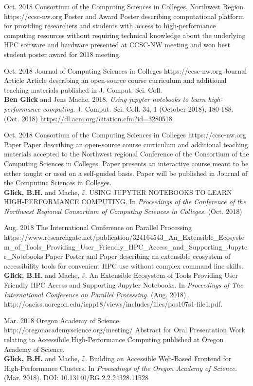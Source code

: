 \documentclass[10pt]{article} %
\begin{document}
\award
{Oct. 2018}
{}
{Consortium of the Computing Sciences in Colleges, Northwest Region.}
{https://ccsc-nw.org}
{Poster and Award}
{Poster describing computational platform for providing researchers and students with access to high-performance computing resources without requiring technical knowledge about the underlying HPC software and hardware presented at CCSC-NW meeting and won best student poster award for 2018 meeting.}


\award
{Oct. 2018}
{}
{Journal of Computing Sciences in Colleges}
{https://ccsc-nw.org}
{Journal Article}
{Article describing an open-source course curriculum and additional teaching materials published in J. Comput. Sci. Coll. \\ \textbf{Ben Glick} and Jens Mache. 2018. \textit{Using jupyter notebooks to learn high-performance computing.} J. Comput. Sci. Coll. 34, 1 (October 2018), 180-188. (Oct. 2018) \href{https://dl.acm.org/citation.cfm?id=3280518}{https://dl.acm.org/citation.cfm?id=3280518}}


\award
{Oct. 2018}
{}
{Consortium of the Computing Sciences in Colleges}
{https://ccsc-nw.org}
{Paper}
{Paper describing an open-source course curriculum and additional teaching materials accepted to the Northwest regional Conference of the Consortium of the Computing Sciences in Colleges. Paper presents an interactive course meant to be either taught or used on a self-guided basis. Paper will be published in Journal of the Computinc Sciences in Colleges.\\ \textbf{Glick, B.H.} and Mache, J. USING JUPYTER NOTEBOOKS TO LEARN HIGH-PERFORMANCE COMPUTING. In \textit{Proceedings of the Conference of the Northwest Regional Consortium of Computing Sciences in Colleges.} (Oct. 2018)}

\award
{Aug. 2018}
{ }
{The International Conference on Parallel Processing}
{https://www.researchgate.net/publication/324164543_An_Extensible_Ecosystem_of_Tools_Providing_User_Friendly_HPC_Access_and_Supporting_Jupyter_Notebooks}
{Paper}
{Poster and Paper describing an extensible ecosystem of accessibility tools for convenient HPC use without complex command line skills.\\ \textbf{Glick, B.H.} and Mache, J. An Extensible Ecosystem of Tools Providing User Friendly HPC Access and Supporting Jupyter Notebooks. In \textit{Proceedings of The International Conference on Parallel Processing.} (Aug. 2018). http://oaciss.uoregon.edu/icpp18/views/includes/files/pos107s1-file1.pdf.}

\award
{Mar. 2018}
{ }
{Oregon Academy of Science}
{http://oregonacademyscience.org/meeting/}
{Abstract for Oral Presentation}
{Work relating to Accessibile High-Performance Computing published at Oregon Academy of Science.\\ \textbf{Glick, B.H.} and Mache, J. Building an Accessible Web-Based Frontend for High-Performance Clusters. In \textit{Proceedings of the Oregon Academy of Science.} (Mar. 2018). DOI: 10.13140/RG.2.2.24328.11528}
\end{document}
